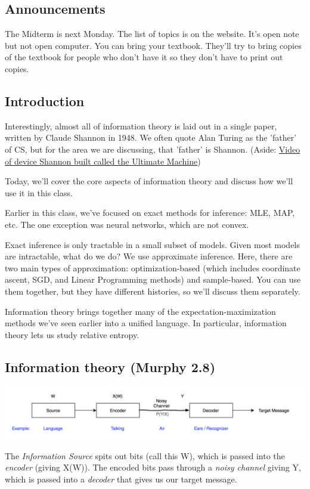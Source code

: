 \documentclass{article}
\begin{document}

\subsection{Announcements}
The Midterm is next Monday. The list of topics is on the website. It's open note but not open computer. You can bring your textbook. They'll try to bring copies of the textbook for people who don't have it so they don't have to print out copies. 

\subsection{Introduction}
Interestingly, almost all of information theory is laid out in a single paper, written by Claude Shannon in 1948. We often quote Alan Turing as the 'father' of CS, but for the area we are discussing, that 'father' is Shannon. (Aside: \href{https://www.youtube.com/watch?v=cZ34RDn34Ws}{Video of device Shannon built called the Ultimate Machine})

\smallskip
Today, we'll cover the core aspects of information theory and discuss how we'll use it in this class.

\smallskip
Earlier in this class, we've focused on exact methods for inference: MLE, MAP, etc. The one exception was neural networks, which are not convex.

\smallskip
Exact inference is only tractable in a small subset of models. Given most models are intractable, what do we do? We use approximate inference. Here, there are two main types of approximation:  optimization-based (which includes coordinate ascent, SGD, and Linear Programming methods) and sample-based. You can use them together, but they have different histories, so we'll discuss them separately. 

\smallskip
Information theory brings together many of the expectation-maximization methods we've seen earlier into a unified language. In particular, information theory lets us study relative entropy.

\subsection{Information theory (Murphy 2.8)}
\begin{center}
\includegraphics[width=\textwidth]{IT-diagram.png}
\end{center}
The \textit{Information Source} spits out bits (call this W), which is passed into the \textit{encoder} (giving X(W)). The encoded bits pass through a \textit{noisy channel} giving Y, which is passed into a \textit{decoder} that gives us our target message.
\end{document}
